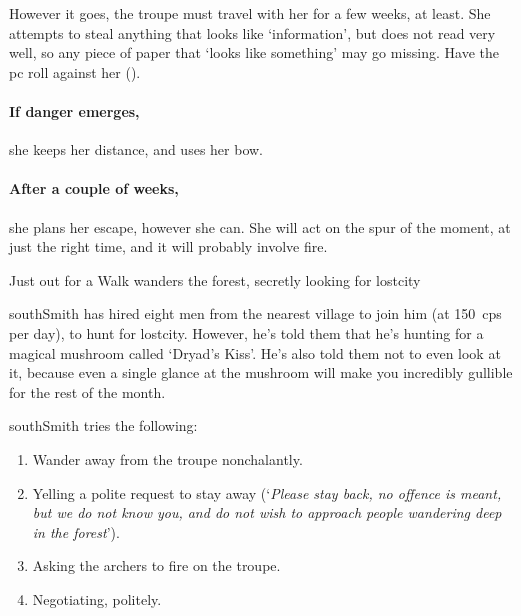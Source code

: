 \southRogue

However it goes, the troupe must travel with her for a few weeks, at least.
She attempts to steal anything that looks like `information', but does not read very well, so any piece of paper that `looks like something' may go missing.
Have the \gls{pc} roll  against her  (\tn).

\paragraph{If danger emerges,}
she keeps her distance, and uses her bow.

\paragraph{After a couple of weeks,}
she plans her escape, however she can.
She will act on the spur of the moment, at just the right time, and it will probably involve fire.

{Just out for a Walk}%
{ wanders the forest, secretly looking for \gls{lostcity}}%

\Gls{southSmith} has hired eight men from the nearest \gls{village} to join him (at 150~\glspl{cp} per day), to hunt for \gls{lostcity}.
However, he's told them that he's hunting for a magical mushroom called `Dryad's Kiss'.%
He's also told them not to even look at it, because even a single glance at the mushroom will make you incredibly gullible for the rest of the month.

\renewcommand\npcQuote{You don't need to trust us to speak politely.  Can we start again?}

\Gls{southSmith} tries the following:

\begin{enumerate}
  \item
  Wander away from the troupe nonchalantly.
  \item
  Yelling a polite request to stay away (`\textit{Please stay back, no offence is meant, but we do not know you, and do not wish to approach people wandering deep in the forest}').
  \item
  Asking the archers to fire on the troupe.
  \item
  Negotiating, politely.
\end{enumerate}


